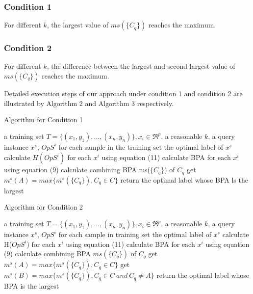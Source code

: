 \documentclass[runningheads]{llncs}
\begin{document}
\subsubsection{Condition 1}
For different $k$, the largest value of $ms(\{C_q\})$ reaches the maximum.
\subsubsection{Condition 2}
For different $k$, the difference between the largest and second largest value of $ms(\{C_q\})$ reaches the maximum.

Detailed execution steps of our approach under condition 1 and condition 2 are illustrated by Algorithm 2 and Algorithm 3 respectively.
\begin{algorithm} %
\caption{Algorithm for Condition 1} %
\label{alg1} %
\begin{algorithmic}[1] %
\REQUIRE  a training set $T=\{(x_1,y_1),...,(x_n,y_n)\}, x_i \in \Re ^p$,  a reasonable $k$, a query instance $x^s$, $OpS^i$ for each sample in the training set %
\ENSURE the optimal label of $x^s$ %
    \STATE  calculate $H(OpS^i)$ for each $x^i$ using equation (11)
    \STATE  calculate BPA for each $x^i$ using equation (9)
    \ENDFOR
    \STATE calculate combining BPA ms($\{C_q\}$) of $C_q$
    \ENDFOR
    \STATE get $m^s(A)=max\{m^s(\{C_q\}),C_q \in C\}$
\ENDFOR
\STATE return the optimal label whose BPA ls the largest
\end{algorithmic}
\end{algorithm}
\begin{algorithm} %
\caption{Algorithm for Condition 2} %
\label{alg1} %
\begin{algorithmic}[1] %
\REQUIRE  a training set $T=\{(x_1,y_1),...,(x_n,y_n)\}, x_i \in \Re ^p$,  a reasonable $k$, a query instance $x^s$, $OpS^i$ for each sample in training set %
\ENSURE the optimal label of $x^s$ %
    \STATE  calculate H($OpS^i$) for each $x^i$ using equation (11)
    \STATE  calculate BPA for each $x^i$ using equation (9)
    \ENDFOR
    \STATE calculate combining BPA $ms(\{C_q\})$ of $C_q$
    \ENDFOR
    \STATE get $m^s(A)=max\{m^s(\{C_q\}),C_q \in C\}$
    \STATE get $m^s(B)=max\{m^s(\{C_q\}),C_q \in C \ and \ C_q \ne A\}$
\ENDFOR
\STATE return the optimal label whose BPA is the largest
\end{algorithmic}
\end{algorithm}
\end{document}
